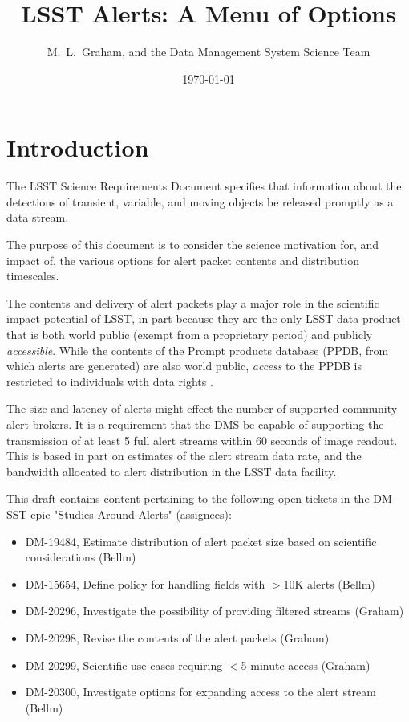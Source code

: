 \documentclass[DM,lsstdraft,authoryear,toc]{lsstdoc}
\title[Alerts Menu]{LSST Alerts: A Menu of Options}
\author{%
M.~L.~Graham, and the Data Management System Science Team
}
\date{\today}
\begin{document}
\maketitle

\section{Introduction} \label{sec:intro}

The LSST Science Requirements Document  specifies that information about the detections of transient, variable, and moving objects be released promptly as a data stream.

The purpose of this document is to consider the science motivation for, and impact of, the various options for alert packet contents and distribution timescales. 

The contents and delivery of alert packets play a major role in the scientific impact potential of LSST, in part because they are the only LSST data product that is both world public (exempt from a proprietary period) and publicly \emph{accessible}. While the contents of the Prompt products database (PPDB, from which alerts are generated) are also world public, \emph{access} to the PPDB is restricted to individuals with data rights \citedsp[LDO-13].

The size and latency of alerts might effect the number of supported community alert brokers. It is a requirement that the DMS be capable of supporting the transmission of at least 5 full alert streams within 60 seconds of image readout. This is based in part on estimates of the alert stream data rate, and the bandwidth allocated to alert distribution in the LSST data facility.

This draft contains content pertaining to the following open tickets in the DM-SST epic "Studies Around Alerts" (assignees):
\begin{itemize}
\item DM-19484, Estimate distribution of alert packet size based on scientific considerations (Bellm)
\item DM-15654, Define policy for handling fields with $>$10K alerts (Bellm)
\item DM-20296, Investigate the possibility of providing filtered streams (Graham)
\item DM-20298, Revise the contents of the alert packets (Graham)
\item DM-20299, Scientific use-cases requiring $<$5 minute access (Graham)
\item DM-20300, Investigate options for expanding access to the alert stream (Bellm)
\end{itemize}
\end{document}
